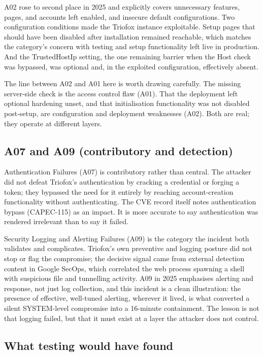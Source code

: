 \documentclass[11pt,a4paper]{article}
\newcommand{\code}[1]{{\small\ttfamily #1}}
\begin{document}
A02 rose to second place in 2025 and explicitly covers unnecessary features, pages, and accounts left enabled, and insecure default configurations. Two configuration conditions made the Triofox instance exploitable. Setup pages that should have been disabled after installation remained reachable, which matches the category's concern with testing and setup functionality left live in production. And the \code{TrustedHostIp} setting, the one remaining barrier when the \code{Host} check was bypassed, was optional and, in the exploited configuration, effectively absent.

The line between A02 and A01 here is worth drawing carefully. The missing server-side check is the access control flaw (A01). That the deployment left optional hardening unset, and that initialisation functionality was not disabled post-setup, are configuration and deployment weaknesses (A02). Both are real; they operate at different layers.

\subsection{A07 and A09 (contributory and detection)}

Authentication Failures (A07) is contributory rather than central. The attacker did not defeat Triofox's authentication by cracking a credential or forging a token; they bypassed the need for it entirely by reaching account-creation functionality without authenticating. The CVE record itself notes authentication bypass (CAPEC-115) as an impact. It is more accurate to say authentication was rendered irrelevant than to say it failed.

Security Logging and Alerting Failures (A09) is the category the incident both validates and complicates. Triofox's own preventive and logging posture did not stop or flag the compromise; the decisive signal came from external detection content in Google SecOps, which correlated the web process spawning a shell with suspicious file and tunnelling activity. A09 in 2025 emphasises alerting and response, not just log collection, and this incident is a clean illustration: the presence of effective, well-tuned alerting, wherever it lived, is what converted a silent \code{SYSTEM}-level compromise into a 16-minute containment. The lesson is not that logging failed, but that it must exist at a layer the attacker does not control.

\subsection{What testing would have found}
\end{document}
